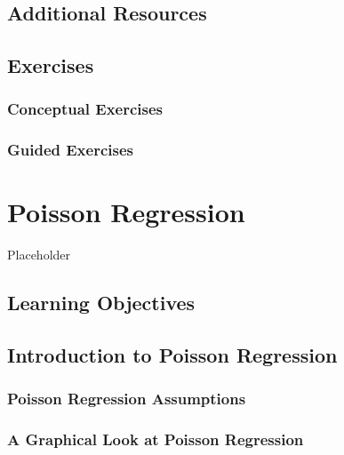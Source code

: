 \documentclass[
]{krantz}
\begin{document}
\hypertarget{additional-resources}{%
\section{Additional Resources}\label{additional-resources}}

\hypertarget{exercises-2}{%
\section{Exercises}\label{exercises-2}}

\hypertarget{conceptual-exercises-2}{%
\subsection{Conceptual Exercises}\label{conceptual-exercises-2}}

\hypertarget{guided-exercises-1}{%
\subsection{Guided Exercises}\label{guided-exercises-1}}

\hypertarget{ch-poissonreg}{%
\chapter{Poisson Regression}\label{ch-poissonreg}}

Placeholder

\hypertarget{learning-objectives-3}{%
\section{Learning Objectives}\label{learning-objectives-3}}

\hypertarget{introduction-to-poisson-regression}{%
\section{Introduction to Poisson Regression}\label{introduction-to-poisson-regression}}

\hypertarget{poisson-regression-assumptions}{%
\subsection{Poisson Regression Assumptions}\label{poisson-regression-assumptions}}

\hypertarget{a-graphical-look-at-poisson-regression}{%
\subsection{A Graphical Look at Poisson Regression}\label{a-graphical-look-at-poisson-regression}}
\end{document}
